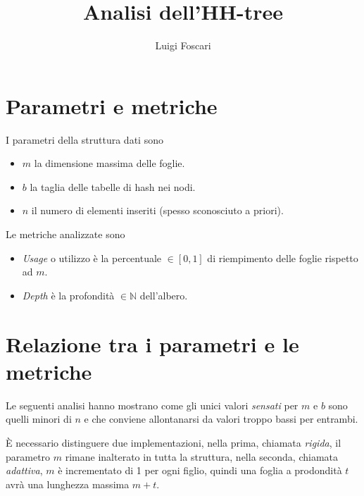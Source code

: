 \documentclass[a4paper]{article}
\title{Analisi dell'HH-tree}
\author{Luigi Foscari}
\date{}
\begin{document}
\maketitle

\section{Parametri e metriche}
I parametri della struttura dati sono
\begin{itemize}
	\item $m$ la dimensione massima delle foglie.
	\item $b$ la taglia delle tabelle di hash nei nodi.
	\item $n$ il numero di elementi inseriti (spesso sconosciuto a priori).
\end{itemize}
Le metriche analizzate sono
\begin{itemize}
	\item \textit{Usage} o utilizzo è la percentuale $\in [0, 1]$ di riempimento delle foglie rispetto ad $m$.
	\item \textit{Depth} è la profondità $\in \mathbb{N}$ dell'albero.
\end{itemize}

\section{Relazione tra i parametri e le metriche}

Le seguenti analisi hanno mostrano come gli unici valori \textit{sensati} per $m$ e $b$ sono quelli minori di $n$ e che conviene allontanarsi da valori troppo bassi per entrambi.

È necessario distinguere due implementazioni, nella prima, chiamata \textit{rigida}, il parametro $m$ rimane inalterato in tutta la struttura, nella seconda, chiamata \textit{adattiva}, $m$ è incrementato di 1 per ogni figlio, quindi una foglia a prodondità $t$ avrà una lunghezza massima $m + t$.

%
\end{document}

